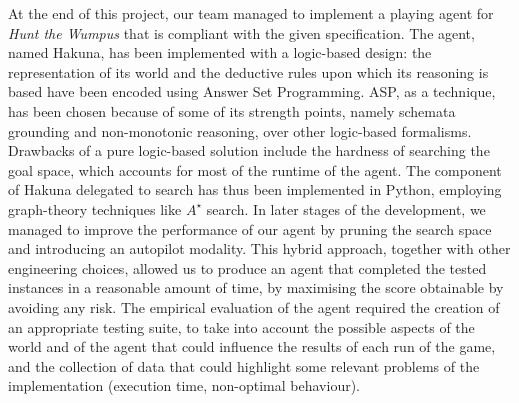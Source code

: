 \documentclass{llncs}
\newcommand{\htw}{\emph{Hunt the Wumpus}\xspace}
\begin{document}
At the end of this project, our team managed to implement a playing agent for \htw that is compliant with the given specification.
The agent, named Hakuna, has been implemented with a logic-based design: the representation of its world and the deductive rules upon which its reasoning is based have been encoded using Answer Set Programming.
ASP, as a technique, has been chosen because of some of its strength points, namely schemata grounding and non-monotonic reasoning, over other logic-based formalisms.
Drawbacks of a pure logic-based solution include the hardness of searching the goal space, which accounts for most of the runtime of the agent.
The component of Hakuna delegated to search has thus been implemented in Python, employing graph-theory techniques like $A^{\star}$ search.
In later stages of the development, we managed to improve the performance of our agent by pruning the search space and introducing an autopilot modality.
This hybrid approach, together with other engineering choices, allowed us to produce an agent that completed the tested instances in a reasonable amount of time, by maximising the score obtainable by avoiding any risk.
The empirical evaluation of the agent required the creation of an appropriate testing suite, to take into account the possible aspects of the world and of the agent that could influence the results of each run of the game, and the collection of data that could highlight some relevant problems of the implementation (execution time, non-optimal behaviour).
\end{document}
